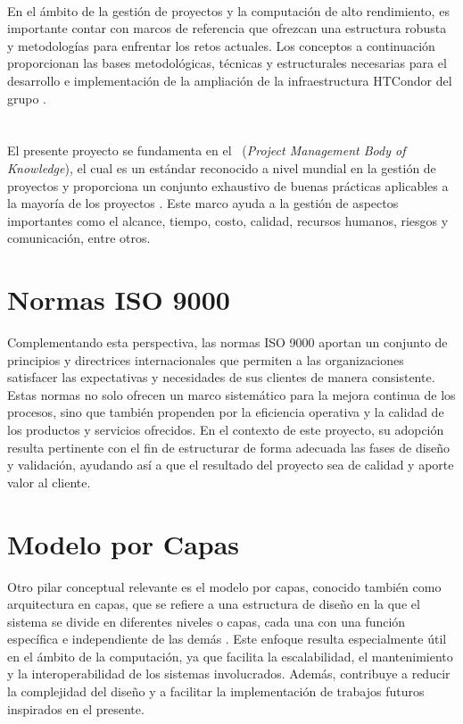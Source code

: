 \label{cap:marcoTeorico}
\mbox{}\\
\noindent
En el ámbito de la gestión de proyectos y la computación de alto rendimiento, es importante contar con marcos de referencia que ofrezcan una estructura robusta y metodologías para enfrentar los retos actuales. Los conceptos a continuación proporcionan las bases metodológicas, técnicas y estructurales necesarias para el desarrollo e implementación de la ampliación de la infraestructura HTCondor del grupo \GRID.

\section{\PMBOK}
\noindent
El presente proyecto se fundamenta en el \PMBOK~(\textit{Project Management Body of Knowledge}), el cual es un estándar reconocido a nivel mundial en la gestión de proyectos y proporciona un conjunto exhaustivo de buenas prácticas aplicables a la mayoría de los proyectos \citep{PMI2019}. Este marco ayuda a la gestión de aspectos importantes como el alcance, tiempo, costo, calidad, recursos humanos, riesgos y comunicación, entre otros.

\section{Normas ISO 9000}
\noindent
Complementando esta perspectiva, las normas ISO 9000 aportan un conjunto de principios y directrices internacionales que permiten a las organizaciones satisfacer las expectativas y necesidades de sus clientes de manera consistente. Estas normas no solo ofrecen un marco sistemático para la mejora continua de los procesos, sino que también propenden por la eficiencia operativa y la calidad de los productos y servicios ofrecidos. En el contexto de este proyecto, su adopción resulta pertinente con el fin de estructurar de forma adecuada las fases de diseño y validación, ayudando así a que el resultado del proyecto sea de calidad y aporte valor al cliente.

\section{Modelo por Capas}
\noindent
Otro pilar conceptual relevante es el modelo por capas, conocido también como arquitectura en capas, que se refiere a una estructura de diseño en la que el sistema se divide en diferentes niveles o capas, cada una con una función específica e independiente de las demás \citep{Spray2023}. Este enfoque resulta especialmente útil en el ámbito de la computación, ya que facilita la escalabilidad, el mantenimiento y la interoperabilidad de los sistemas involucrados. Además, contribuye a reducir la complejidad del diseño y a facilitar la implementación de trabajos futuros inspirados en el presente.

